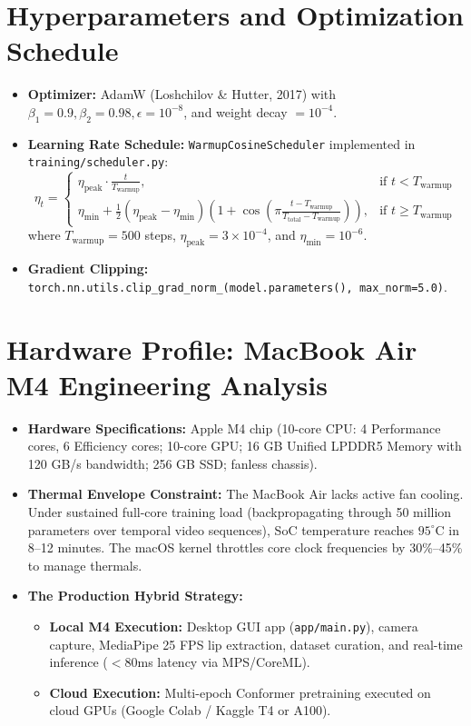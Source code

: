 \documentclass[11pt,a4paper]{report}
\begin{document}
\section{Hyperparameters and Optimization Schedule}
\begin{itemize}
    \item \textbf{Optimizer:} AdamW (Loshchilov \& Hutter, 2017) with $\beta_1 = 0.9, \beta_2 = 0.98, \epsilon = 10^{-8}$, and weight decay $= 10^{-4}$.
    \item \textbf{Learning Rate Schedule:} \texttt{WarmupCosineScheduler} implemented in \texttt{training/scheduler.py}:
    \begin{equation}
        \eta_t = \begin{cases}
            \eta_{\text{peak}} \cdot \frac{t}{T_{\text{warmup}}}, & \text{if } t < T_{\text{warmup}} \\
            \eta_{\text{min}} + \frac{1}{2}(\eta_{\text{peak}} - \eta_{\text{min}})\left(1 + \cos\left(\pi \frac{t - T_{\text{warmup}}}{T_{\text{total}} - T_{\text{warmup}}}\right)\right), & \text{if } t \ge T_{\text{warmup}}
        \end{cases}
    \end{equation}
    where $T_{\text{warmup}} = 500$ steps, $\eta_{\text{peak}} = 3 \times 10^{-4}$, and $\eta_{\text{min}} = 10^{-6}$.
    \item \textbf{Gradient Clipping:} \texttt{torch.nn.utils.clip\_grad\_norm\_(model.parameters(), max\_norm=5.0)}.
\end{itemize}

\section{Hardware Profile: MacBook Air M4 Engineering Analysis}
\begin{itemize}
    \item \textbf{Hardware Specifications:} Apple M4 chip (10-core CPU: 4 Performance cores, 6 Efficiency cores; 10-core GPU; 16 GB Unified LPDDR5 Memory with 120 GB/s bandwidth; 256 GB SSD; fanless chassis).
    \item \textbf{Thermal Envelope Constraint:} The MacBook Air lacks active fan cooling. Under sustained full-core training load (backpropagating through 50 million parameters over temporal video sequences), SoC temperature reaches $95^\circ\text{C}$ in 8--12 minutes. The macOS kernel throttles core clock frequencies by 30\%--45\% to manage thermals.
    \item \textbf{The Production Hybrid Strategy:}
    \begin{itemize}
        \item \textbf{Local M4 Execution:} Desktop GUI app (\texttt{app/main.py}), camera capture, MediaPipe 25 FPS lip extraction, dataset curation, and real-time inference ($<80$ms latency via MPS/CoreML).
        \item \textbf{Cloud Execution:} Multi-epoch Conformer pretraining executed on cloud GPUs (Google Colab / Kaggle T4 or A100).
    \end{itemize}
\end{itemize}
\end{document}
